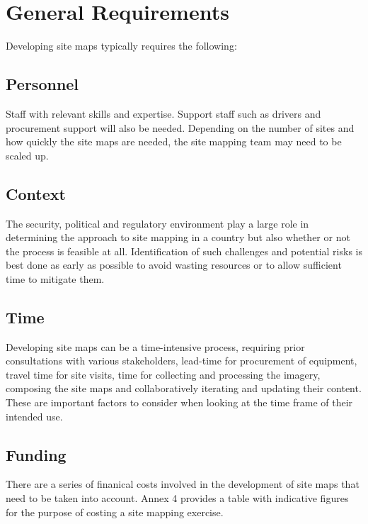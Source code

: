 \documentclass[
  a4paper,
  onecolumn,
  oneside]{book}
\begin{document}
\hypertarget{general-requirements}{%
\section{General Requirements}\label{general-requirements}}

Developing site maps typically requires the following:

\hypertarget{personnel}{%
\subsection{Personnel}\label{personnel}}

Staff with relevant skills and expertise. Support staff such as drivers
and procurement support will also be needed. Depending on the number of
sites and how quickly the site maps are needed, the site mapping team
may need to be scaled up.

\hypertarget{context}{%
\subsection{Context}\label{context}}

The security, political and regulatory environment play a large role in
determining the approach to site mapping in a country but also whether
or not the process is feasible at all. Identification of such challenges
and potential risks is best done as early as possible to avoid wasting
resources or to allow sufficient time to mitigate them.

\hypertarget{time}{%
\subsection{Time}\label{time}}

Developing site maps can be a time-intensive process, requiring prior
consultations with various stakeholders, lead-time for procurement of
equipment, travel time for site visits, time for collecting and
processing the imagery, composing the site maps and collaboratively
iterating and updating their content. These are important factors to
consider when looking at the time frame of their intended use.

\hypertarget{funding}{%
\subsection{Funding}\label{funding}}

There are a series of finanical costs involved in the development of
site maps that need to be taken into account. Annex 4 provides a table
with indicative figures for the purpose of costing a site mapping
exercise.
\end{document}
